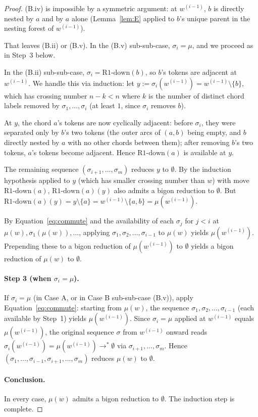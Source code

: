 \begin{proof}
(B.iv) is impossible by a symmetric argument: at $w^{(i-1)}$, $b$ is
directly nested by $a$ and by $a$ alone (Lemma~\ref{lem:E} applied to
$b$'s unique parent in the nesting forest of $w^{(i-1)}$).

That leaves (B.ii) or (B.v). In the (B.v) sub-sub-case,
$\sigma_i = \mu$, and we proceed as in Step~3 below.

In the (B.ii) sub-sub-case, $\sigma_i = \text{R1-down}(b)$, so
$b$'s tokens are adjacent at $w^{(i-1)}$. We handle this via
induction: let $y := \sigma_i(w^{(i-1)}) = w^{(i-1)} \setminus \{b\}$,
which has crossing number $n - k < n$ where $k$ is the number of
distinct chord labels removed by $\sigma_1, \dots, \sigma_i$ (at least
$1$, since $\sigma_i$ removes $b$).

At $y$, the chord $a$'s tokens are now cyclically adjacent: before
$\sigma_i$, they were separated only by $b$'s two tokens (the outer
arcs of $(a, b)$ being empty, and $b$ directly nested by $a$ with no
other chords between them); after removing $b$'s two tokens,
$a$'s tokens become adjacent. Hence $\text{R1-down}(a)$ is available
at $y$.

The remaining sequence $(\sigma_{i+1}, \dots, \sigma_m)$ reduces $y$
to $\emptyset$. By the induction hypothesis applied to $y$ (which has
smaller crossing number than $w$) with move $\text{R1-down}(a)$,
$\text{R1-down}(a)(y)$ also admits a bigon reduction to $\emptyset$.
But $\text{R1-down}(a)(y) = y \setminus \{a\} = w^{(i-1)} \setminus
\{a, b\} = \mu(w^{(i-1)})$.

By Equation~\eqref{eq:commute} and the availability of each
$\sigma_j$ for $j < i$ at $\mu(w), \sigma_1(\mu(w)), \dots$, applying
$\sigma_1, \sigma_2, \dots, \sigma_{i-1}$ to $\mu(w)$ yields
$\mu(w^{(i-1)})$. Prepending these to a bigon reduction of
$\mu(w^{(i-1)})$ to $\emptyset$ yields a bigon reduction of $\mu(w)$
to $\emptyset$.

\paragraph{Step 3 (when $\sigma_i = \mu$).}
If $\sigma_i = \mu$ (in Case A, or in Case B sub-sub-case (B.v)),
apply Equation~\eqref{eq:commute}: starting from $\mu(w)$, the
sequence $\sigma_1, \sigma_2, \dots, \sigma_{i-1}$ (each available by
Step~1) yields $\mu(w^{(i-1)})$. Since $\sigma_i = \mu$ applied at
$w^{(i-1)}$ equals $\mu(w^{(i-1)})$, the original sequence $\sigma$
from $w^{(i-1)}$ onward reads $\sigma_i(w^{(i-1)}) = \mu(w^{(i-1)})
\to^{*} \emptyset$ via $\sigma_{i+1}, \dots, \sigma_m$. Hence
$(\sigma_1, \dots, \sigma_{i-1}, \sigma_{i+1}, \dots, \sigma_m)$
reduces $\mu(w)$ to $\emptyset$.

\paragraph{Conclusion.}
In every case, $\mu(w)$ admits a bigon reduction to $\emptyset$. The
induction step is complete.
\end{proof}
